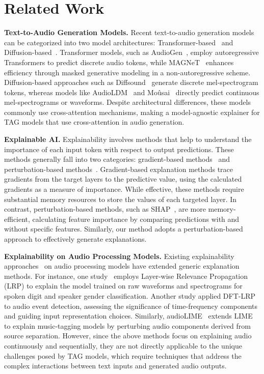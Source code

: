 \section{Related Work}
\label{sec:related}

\textbf{Text-to-Audio Generation Models.} Recent text-to-audio generation models can be categorized into two model architectures: Transformer-based~\cite{kreuk2022audiogen, ziv2024masked} and Diffusion-based~\cite{yang2023diffsound, liu2023audioldm, schneider2023mo}. Transformer models, such as AudioGen~\cite{kreuk2022audiogen}, employ autoregressive Transformers to predict discrete audio tokens, while MAGNeT~\cite{ziv2024masked} enhances efficiency through masked generative modeling in a non-autoregressive scheme. Diffusion-based approaches such as Diffsound~\cite{yang2023diffsound} generate discrete mel-spectrogram tokens, whereas models like AudioLDM~\cite{liu2023audioldm} and Moûsai~\cite{schneider2023mo} directly predict continuous mel-spectrograms or waveforms. Despite architectural differences, these models commonly use cross-attention mechanisms, making \mname{} a model-agnostic explainer for TAG models that use cross-attention in audio generation.

\textbf{Explainable AI.}  Explainability involves methods that help to understand the importance of each input token with respect to output predictions. These methods generally fall into two categories: gradient-based methods~\cite{selvaraju2017grad, sundararajan2017axiomatic, nagahisarchoghaei2023empirical} and perturbation-based methods~\cite{ribeiro2016should, lundberg2017unified}. Gradient-based explanation methods trace gradients from the target layers to the predictive value, using the calculated gradients as a measure of importance. While effective, these methods require substantial memory resources to store the values of each targeted layer. In contrast, perturbation-based methods, such as SHAP~\cite{lundberg2017unified}, are more memory-efficient, calculating feature importance by comparing predictions with and without specific features. Similarly, our method adopts a perturbation-based approach to effectively generate explanations.

\textbf{Explainability on Audio Processing Models.} Existing explainability approaches~\cite{akman2024audio} on audio processing models have extended generic explanation methods. For instance, one study~\cite{becker2018interpreting} employs Layer-wise Relevance Propagation (LRP) to explain the model trained on raw waveforms and spectrograms for spoken digit and speaker gender classification. Another study applied DFT-LRP~\cite{frommholz2023xai} to audio event detection, assessing the significance of time-frequency components and guiding input representation choices. Similarly, audioLIME~\cite{haunschmid2020audiolime} extends LIME~\cite{ribeiro2016should} to explain music-tagging models by perturbing audio components derived from source separation. However, since the above methods focus on explaining audio continuously and sequentially, they are not directly applicable to the unique challenges posed by TAG models, which require techniques that address the complex interactions between text inputs and generated audio outputs.


